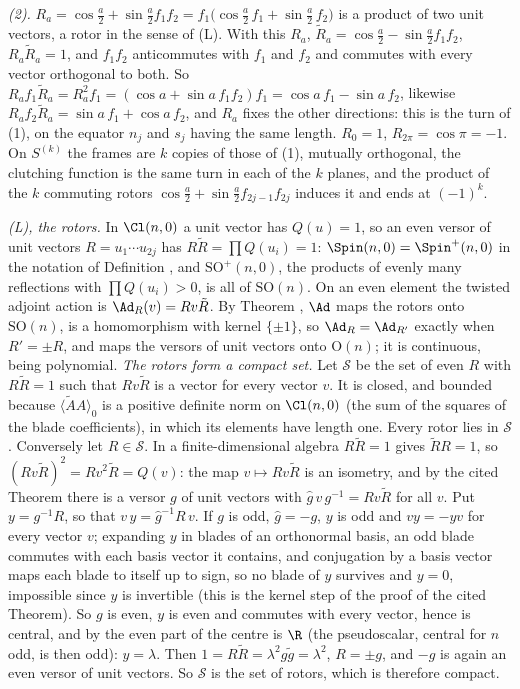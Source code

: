 \emph{(2).} $R_{a} = \cos\tfrac a2 + \sin\tfrac a2 f_{1}f_{2} = f_{1}\bigl(\cos\tfrac a2\,f_{1} + \sin\tfrac a2\,f_{2}\bigr)$ is a product of two unit vectors, a rotor in the sense of (L). With this $R_{a}$, $\tilde R_{a} = \cos\tfrac a2 - \sin\tfrac a2 f_{1}f_{2}$, $R_{a}\tilde R_{a} = 1$, and $f_{1}f_{2}$ anticommutes with $f_{1}$ and $f_{2}$ and commutes with every vector orthogonal to both. So $R_{a}f_{1}\tilde R_{a} = R_{a}^{2}f_{1} = (\cos a + \sin a\,f_{1}f_{2})f_{1} = \cos a\,f_{1} - \sin a\,f_{2}$, likewise $R_{a}f_{2}\tilde R_{a} = \sin a\,f_{1} + \cos a\,f_{2}$, and $R_{a}$ fixes the other directions: this is the turn of (1), on the equator $n_{j}$ and $s_{j}$ having the same length. $R_{0} = 1$, $R_{2\pi} = \cos\pi = -1$. On $S^{(k)}$ the frames are $k$ copies of those of (1), mutually orthogonal, the clutching function is the same turn in each of the $k$ planes, and the product of the $k$ commuting rotors $\cos\tfrac a2 + \sin\tfrac a2 f_{2j-1}f_{2j}$ induces it and ends at $(-1)^{k}$.

\emph{(L), the rotors.} In $\Cl(n,0)$ a unit vector has $Q(u) = 1$, so an even versor of unit vectors $R = u_{1}\cdots u_{2j}$ has $R\tilde R = \prod Q(u_{i}) = 1$: $\Spin(n,0) = \Spin^{+}(n,0)$ in the notation of Definition , and $\mathrm{SO}^{+}(n,0)$, the products of evenly many reflections with $\prod Q(u_{i}) > 0$, is all of $\mathrm{SO}(n)$. On an even element the twisted adjoint action is $\Ad_{R}(v) = Rv\tilde R$. By Theorem , $\Ad$ maps the rotors onto $\mathrm{SO}(n)$, is a homomorphism with kernel $\{\pm 1\}$, so $\Ad_{R} = \Ad_{R'}$ exactly when $R' = \pm R$, and maps the versors of unit vectors onto $\mathrm{O}(n)$; it is continuous, being polynomial. \emph{The rotors form a compact set.} Let $\mathcal S$ be the set of even $R$ with $R\tilde R = 1$ such that $Rv\tilde R$ is a vector for every vector $v$. It is closed, and bounded because $\langle \tilde A A \rangle_{0}$ is a positive definite norm on $\Cl(n,0)$ (the sum of the squares of the blade coefficients), in which its elements have length one. Every rotor lies in $\mathcal S$. Conversely let $R \in \mathcal S$. In a finite-dimensional algebra $R\tilde R = 1$ gives $\tilde R R = 1$, so $(Rv\tilde R)^{2} = Rv^{2}\tilde R = Q(v)$: the map $v \mapsto Rv\tilde R$ is an isometry, and by the cited Theorem there is a versor $g$ of unit vectors with $\hat g\,v\,g^{-1} = Rv\tilde R$ for all $v$. Put $y = g^{-1}R$, so that $v\,y = \hat g^{-1}R\,v$. If $g$ is odd, $\hat g = -g$, $y$ is odd and $vy = -yv$ for every vector $v$; expanding $y$ in blades of an orthonormal basis, an odd blade commutes with each basis vector it contains, and conjugation by a basis vector maps each blade to itself up to sign, so no blade of $y$ survives and $y = 0$, impossible since $y$ is invertible (this is the kernel step of the proof of the cited Theorem). So $g$ is even, $y$ is even and commutes with every vector, hence is central, and by  the even part of the centre is $\R$ (the pseudoscalar, central for $n$ odd, is then odd): $y = \lambda$. Then $1 = R\tilde R = \lambda^{2}g\tilde g = \lambda^{2}$, $R = \pm g$, and $-g$ is again an even versor of unit vectors. So $\mathcal S$ is the set of rotors, which is therefore compact.


